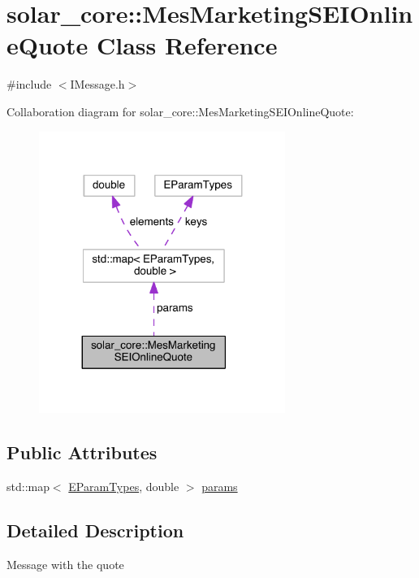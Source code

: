\hypertarget{classsolar__core_1_1_mes_marketing_s_e_i_online_quote}{}\section{solar\+\_\+core\+:\+:Mes\+Marketing\+S\+E\+I\+Online\+Quote Class Reference}
\label{classsolar__core_1_1_mes_marketing_s_e_i_online_quote}


{\ttfamily \#include $<$I\+Message.\+h$>$}



Collaboration diagram for solar\+\_\+core\+:\+:Mes\+Marketing\+S\+E\+I\+Online\+Quote\+:
\nopagebreak
\begin{figure}[H]
\begin{center}
\leavevmode
\includegraphics[width=227pt]{classsolar__core_1_1_mes_marketing_s_e_i_online_quote__coll__graph}
\end{center}
\end{figure}
\subsection*{Public Attributes}
\begin{DoxyCompactItemize}
\item 
std\+::map$<$ \hyperlink{namespacesolar__core_aa1147341e5ef7a40d68d1bd68e149362}{E\+Param\+Types}, double $>$ \hyperlink{classsolar__core_1_1_mes_marketing_s_e_i_online_quote_a985cbf3eb866c4488f0de003c4090aaf}{params}
\end{DoxyCompactItemize}


\subsection{Detailed Description}
Message with the quote

